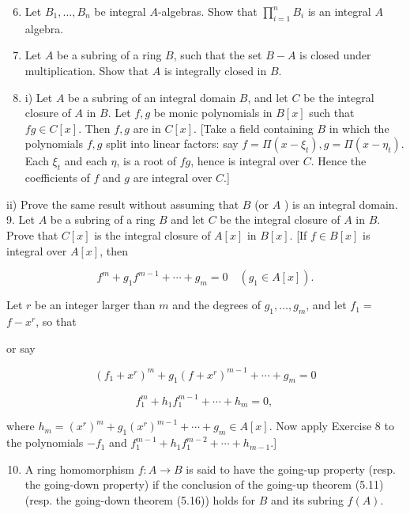 \documentclass{standalone}
\theoremstyle{definition}
\theoremstyle{remark}
\begin{document}
\begin{enumerate}
  \setcounter{enumi}{5}
  \item Let $B_{1}, \ldots, B_{n}$ be integral $A$-algebras. Show that $\prod_{i=1}^{n} B_{i}$ is an integral $A$ algebra.

  \item Let $A$ be a subring of a ring $B$, such that the set $B-A$ is closed under multiplication. Show that $A$ is integrally closed in $B$.

  \item i) Let $A$ be a subring of an integral domain $B$, and let $C$ be the integral closure of $A$ in $B$. Let $f, g$ be monic polynomials in $B[x]$ such that $f g \in C[x]$. Then $f, g$ are in $C[x]$. [Take a field containing $B$ in which the polynomials $f, g$ split into linear factors: say $f=\Pi\left(x-\xi_{t}\right), g=\Pi\left(x-\eta_{t}\right)$. Each $\xi_{t}$ and each $\eta$, is a root of $f g$, hence is integral over $C$. Hence the coefficients of $f$ and $g$ are integral over $C$.]

\end{enumerate}

ii) Prove the same result without assuming that $B$ (or $A$ ) is an integral domain. 9. Let $A$ be a subring of a ring $B$ and let $C$ be the integral closure of $A$ in $B$. Prove that $C[x]$ is the integral closure of $A[x]$ in $B[x]$. [If $f \in B[x]$ is integral over $A[x]$, then

\[
f^{m}+g_{1} f^{m-1}+\cdots+g_{m}=0 \quad\left(g_{1} \in A[x]\right) .
\]

Let $r$ be an integer larger than $m$ and the degrees of $g_{1}, \ldots, g_{m}$, and let $f_{1}=$ $f-x^{r}$, so that

or say

\[
\left(f_{1}+x^{r}\right)^{m}+g_{1}\left(f+x^{r}\right)^{m-1}+\cdots+g_{m}=0
\]

\[
f_{1}^{m}+h_{1} f_{1}^{m-1}+\cdots+h_{m}=0 \text {, }
\]

where $h_{m}=\left(x^{r}\right)^{m}+g_{1}\left(x^{r}\right)^{m-1}+\cdots+g_{m} \in A[x]$. Now apply Exercise 8 to the polynomials $-f_{1}$ and $f_{1}^{m-1}+h_{1} f_{1}^{m-2}+\cdots+h_{m-1}$.]

\begin{enumerate}
  \setcounter{enumi}{9}
  \item A ring homomorphism $f: A \rightarrow B$ is said to have the going-up property (resp. the going-down property) if the conclusion of the going-up theorem (5.11) (resp. the going-down theorem (5.16)) holds for $B$ and its subring $f(A)$.
\end{enumerate}
\end{document}
